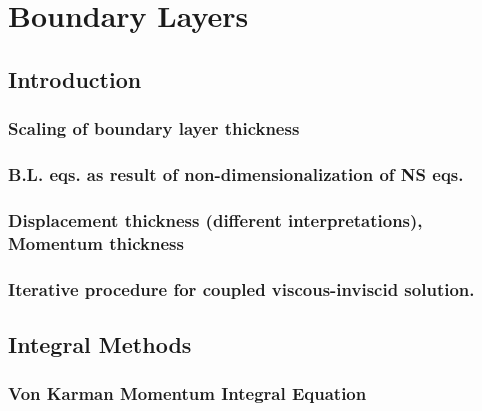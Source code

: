 \documentclass[oneside,a4paper,11pt]{report}
\begin{document}
%
\chapter{Boundary Layers}
%

\section{Introduction}

\subsection{Scaling of boundary layer thickness}

\subsection{B.L. eqs. as result of non-dimensionalization of NS eqs.}

\subsection{Displacement thickness (different interpretations), Momentum thickness}

\subsection{Iterative procedure for coupled viscous-inviscid solution.}

\section{Integral Methods}

\subsection{Von Karman Momentum Integral Equation}
\end{document}
